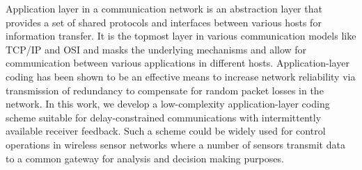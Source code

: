 
Application layer in a communication network is an abstraction layer that provides a set of shared protocols and interfaces between various hosts for information transfer. It is the topmost layer in various communication models like TCP/IP and OSI and masks the underlying mechanisms and allow for communication between various applications in different hosts. Application-layer coding has been shown to be an effective means to increase network reliability via transmission of redundancy to compensate for random packet losses in the network. In this work, we develop a low-complexity application-layer coding scheme suitable for delay-constrained communications with intermittently available receiver feedback. Such a scheme could be widely used for control operations in wireless sensor networks where a number of sensors transmit data to a common gateway for analysis and decision making purposes.

\newpage
